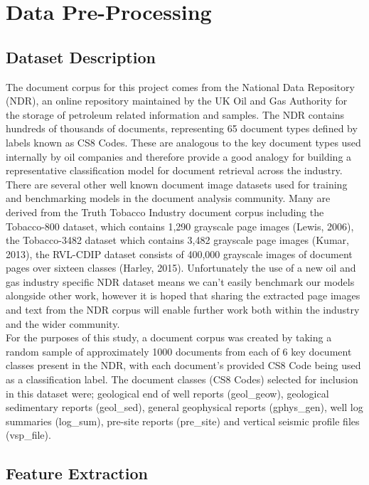 \documentclass[a4paper,12pt]{article}
\begin{document}
\section{Data Pre-Processing}
\subsection{Dataset Description}
The document corpus for this project comes from the National Data Repository (NDR), an online repository maintained by the UK Oil and Gas Authority for the storage of petroleum related information and samples. The NDR contains hundreds of thousands of documents, representing 65 document types defined by labels known as CS8 Codes. These are analogous to the key document types used internally by oil companies and therefore provide a good analogy for building a representative classification model for document retrieval across the industry. \\

There are several other well known document image datasets used for training and benchmarking models in the document analysis community. Many are derived from the Truth Tobacco Industry document corpus including the Tobacco-800 dataset, which contains 1,290 grayscale page images (Lewis, 2006), the Tobacco-3482 dataset which contains 3,482 grayscale page images (Kumar, 2013), the RVL-CDIP dataset consists of 400,000 grayscale images of document pages over sixteen classes (Harley, 2015). Unfortunately the use of a new oil and gas industry specific NDR dataset means we can't easily benchmark our models alongside other work, however it is hoped that sharing the extracted page images and text from the NDR corpus will enable further work both within the industry and the wider community.\\

For the purposes of this study, a document corpus was created by taking a random sample of approximately 1000 documents from each of 6 key document classes present in the NDR, with each document's provided CS8 Code being used as a classification label. The document classes (CS8 Codes) selected for inclusion in this dataset were; geological end of well reports (geol\_geow), geological sedimentary reports (geol\_sed), general geophysical reports (gphys\_gen), well log summaries (log\_sum), pre-site reports (pre\_site) and  vertical seismic profile files (vsp\_file).\\

\subsection{Feature Extraction}
\end{document}

